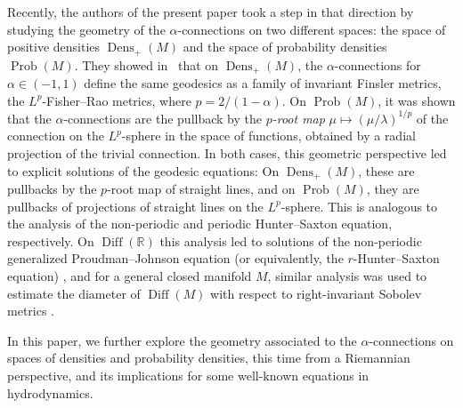 \documentclass[11pt,reqno]{amsart}
\theoremstyle{definition}
\newcommand{\Prob}{\operatorname{Prob}(M)}
\newcommand{\Dens}{\operatorname{Dens}_+(M)}
\newcommand{\Diff}{\operatorname{Diff}(M)}
\newcommand{\DiffR}{\operatorname{Diff}(\mathbb R)}
\newcommand{\orange}[1]{{\color{orange}#1}}
\begin{document}
Recently, the authors of the present paper took a step in that direction by studying the geometry of the $\alpha$-connections on two different spaces: the space of positive densities $\Dens$ and the space of probability densities $\Prob$. They showed in~\cite{bauer2024p} that on $\Dens$, the $\alpha$-connections for $\alpha\in(-1,1)$ define the same geodesics as a family of invariant Finsler metrics, the $L^p$-Fisher--Rao metrics, where $p=2/(1-\alpha)$. On $\Prob$, it was shown that the $\alpha$-connections are the pullback by the \emph{$p$-root map }$\mu\mapsto (\mu/\lambda)^{1/p}$ of the connection on the $L^p$-sphere in the space of functions, obtained by a radial projection of the trivial connection.
 In both cases, this geometric perspective led to explicit solutions of the geodesic equations: On $\Dens$, these are pullbacks by the $p$-root map %
 of straight lines, and on $\Prob$, they are pullbacks of projections of straight lines on the $L^p$-sphere.
 This is analogous to the analysis of the non-periodic \cite{bauer2014homogeneous} and periodic \cite{lenells2007hunter} Hunter--Saxton equation, respectively.
On $\DiffR$ this analysis led to solutions of the non-periodic generalized Proudman--Johnson equation (or equivalently, the $r$-Hunter--Saxton equation) \cite{cotter2020r, bauer2022geometric}, and for a general closed manifold $M$, similar analysis was used to estimate the diameter of $\Diff$ with respect to right-invariant Sobolev metrics \cite{bauer2021can}. 

In this paper, we further explore the geometry associated to the $\alpha$-connections on spaces of densities and probability densities, this time from a Riemannian perspective, and its implications for some well-known equations in hydrodynamics.

\end{document}
